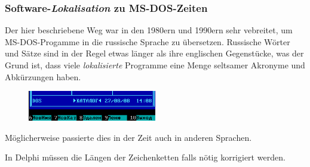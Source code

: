 %

\subsubsection{Software-\emph{Lokalisation} zu MS-DOS-Zeiten}

Der hier beschriebene Weg war in den 1980ern und  1990ern sehr vebreitet, um MS-DOS-Progamme in die russische Sprache zu übersetzen.
Russische Wörter und Sätze sind in der Regel etwas länger als ihre englischen Gegenstücke, was der Grund ist, dass
viele \emph{lokalisierte} Programme eine Menge seltsamer Akronyme und Abkürzungen haben.

\begin{figure}[H]
\centering
\includegraphics[width=0.5\textwidth]{patterns/01_helloworld/Norton_Commander_v5_51.png}
\caption{\DEph{}}
\end{figure}

Möglicherweise passierte dies in der Zeit auch in anderen Sprachen.

In Delphi müssen die Längen der Zeichenketten falls nötig korrigiert werden.
